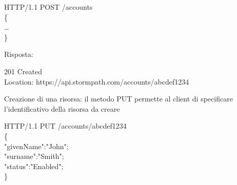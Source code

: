 \begin{flushleft}
\hspace{1cm}HTTP/1.1 POST /accounts\\
\hspace{1cm}\{\\
\hspace{2cm}\dots\\
\hspace{1cm}\}\\
\end{flushleft}
Risposta:

\begin{flushleft}
201 Created\\
Location: https://api.stormpath.com/accounts/abcdef1234
\end{flushleft}

Creazione di una risorsa: il metodo PUT permette al client di specificare l'identificativo della risorsa da creare
\begin{flushleft}
\hspace{1cm}HTTP/1.1 PUT /accounts/abcdef1234\\
\hspace{1cm}\{\\
\hspace{2cm}"givenName":"John";\\
\hspace{2cm}"surname":"Smith";\\
\hspace{2cm}"status":"Enabled";\\
\hspace{1cm}\}\\
\end{flushleft}


